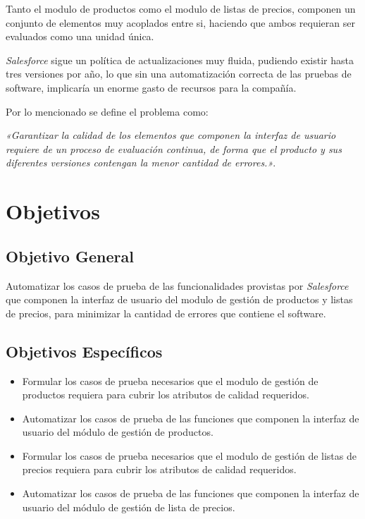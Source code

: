 Tanto el modulo de productos como el modulo de listas de precios, componen un
conjunto de elementos muy acoplados entre si, haciendo que ambos requieran ser
evaluados como una unidad única.

\emph{Salesforce} sigue un política de actualizaciones muy fluida, pudiendo
existir hasta tres versiones por año, lo que sin una automatización correcta
de las pruebas de software, implicaría un enorme gasto de recursos para la
compañía.

Por lo mencionado se define el problema como:

\emph{«Garantizar la calidad de los elementos que componen la interfaz de
usuario requiere de un proceso de evaluación continua, de forma que el
producto y sus diferentes versiones contengan la menor cantidad de errores.»}.

\section{Objetivos}

\subsection{Objetivo General}
Automatizar los casos de prueba de las funcionalidades provistas por
\emph{Salesforce} que componen la interfaz de usuario del modulo de gestión de
productos y listas de precios, para minimizar la cantidad de errores que
contiene el software.

\subsection{Objetivos Específicos}
\begin{itemize}
\item Formular los casos de prueba necesarios que el modulo de gestión de
    productos requiera para cubrir los atributos de calidad requeridos.
\item Automatizar los casos de prueba de las funciones que componen la interfaz
    de usuario del módulo de gestión de productos.
\item Formular los casos de prueba necesarios que el modulo de gestión de
    listas de precios requiera para cubrir los atributos de calidad requeridos.
\item Automatizar los casos de prueba de las funciones que componen la interfaz
    de usuario del módulo de gestión de lista de precios.
\end{itemize}

